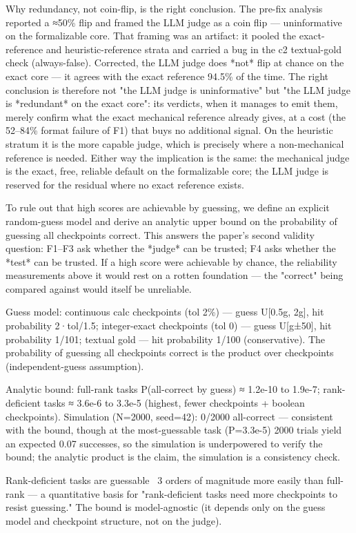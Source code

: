 \documentclass[10pt,twocolumn]{article}
\begin{document}
Why redundancy, not coin-flip, is the right conclusion. The pre-fix analysis reported a ≈50\% flip and framed the LLM judge as a coin flip — uninformative on the formalizable core. That framing was an artifact: it pooled the exact-reference and heuristic-reference strata and carried a bug in the c2 textual-gold check (always-false). Corrected, the LLM judge does *not* flip at chance on the exact core — it agrees with the exact reference 94.5\% of the time. The right conclusion is therefore not "the LLM judge is uninformative" but "the LLM judge is *redundant* on the exact core": its verdicts, when it manages to emit them, merely confirm what the exact mechanical reference already gives, at a cost (the 52–84\% format failure of F1) that buys no additional signal. On the heuristic stratum it is the more capable judge, which is precisely where a non-mechanical reference is needed. Either way the implication is the same: the mechanical judge is the exact, free, reliable default on the formalizable core; the LLM judge is reserved for the residual where no exact reference exists.


To rule out that high scores are achievable by guessing, we define an explicit random-guess model and derive an analytic upper bound on the probability of guessing all checkpoints correct. This answers the paper's second validity question: F1–F3 ask whether the *judge* can be trusted; F4 asks whether the *test* can be trusted. If a high score were achievable by chance, the reliability measurements above it would rest on a rotten foundation — the "correct" being compared against would itself be unreliable.


Guess model: continuous calc checkpoints (tol 2\%) — guess U[0.5g, 2g], hit probability 2·tol/1.5; integer-exact checkpoints (tol 0) — guess U[g±50], hit probability 1/101; textual gold — hit probability 1/100 (conservative). The probability of guessing all checkpoints correct is the product over checkpoints (independent-guess assumption).


Analytic bound: full-rank tasks P(all-correct by guess) ≈ 1.2e-10 to 1.9e-7; rank-deficient tasks ≈ 3.6e-6 to 3.3e-5 (highest, fewer checkpoints + boolean checkpoints). Simulation (N=2000, seed=42): 0/2000 all-correct — consistent with the bound, though at the most-guessable task (P=3.3e-5) 2000 trials yield an expected 0.07 successes, so the simulation is underpowered to verify the bound; the analytic product is the claim, the simulation is a consistency check.


Rank-deficient tasks are guessable ~3 orders of magnitude more easily than full-rank — a quantitative basis for "rank-deficient tasks need more checkpoints to resist guessing." The bound is model-agnostic (it depends only on the guess model and checkpoint structure, not on the judge).
\end{document}
